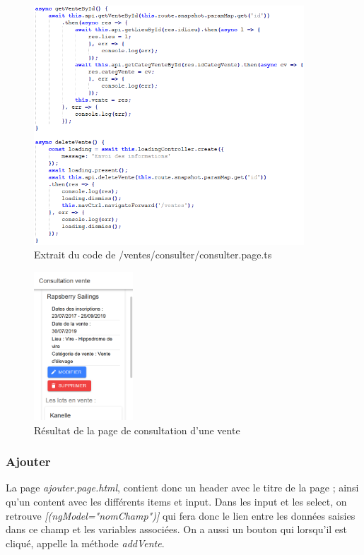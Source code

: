 			\begin{figure}[H]
				\centering\includegraphics[width=0.9\textwidth, keepaspectratio]{res/consulterTs.png}
				\caption{Extrait du code de /ventes/consulter/consulter.page.ts}
			\end{figure}

			\begin{figure}[H]
				\centering\includegraphics[width=0.33\textwidth, keepaspectratio]{res/consulterVente.png}
				\caption{Résultat de la page de consultation d'une vente}
			\end{figure}

			\subsubsection{Ajouter}

			La page \textit{ajouter.page.html}, contient donc un header avec le titre de la page ; ainsi qu'un content avec les différents items et input. \newline
			Dans les input et les select, on retrouve \textit{[(ngModel="nomChamp")]} qui fera donc le lien entre les données saisies dans ce champ et les variables associées.\newline
			On a aussi un bouton qui lorsqu'il est cliqué, appelle la méthode \textit{addVente}.


